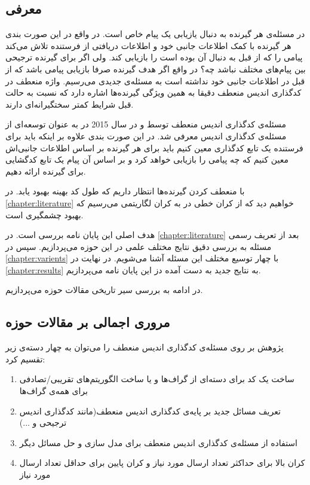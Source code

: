  \subsection{معرفی}
 در مسئله‌ی
 \icod
 هر گیرنده به دنبال یازیابی یک پیام خاص است. در واقع در این صورت بندی هر گیرنده با کمک اطلاعات جانبی خود و اطلاعات دریافتی از فرستنده تلاش می‌کند پیامی را که از قبل به دنبال آن بوده است را بازیابی کند. ولی اگر برای گیرنده ترجیحی بین پیام‌های مختلف نباشد چه؟ در واقع اگر هدف گیرنده صرفا بازیابی پیامی باشد که از قبل در اطلاعات جانبی خود نداشته است به مسئله‌ی جدیدی می‌رسیم. واژه منعطف در کدگذاری اندیس منعطف دقیقا به همین ویژگی گیرنده‌ها اشاره دارد که نسبت به حالت قبل شرایط کمتر سختگیرانه‌ای دارند.
 
 مسئله‌ی کدگذاری اندیس منعطف توسط 
 و 
  در سال 2015 در
 \cite{pliablefirstpaper}
 به عنوان توسعه‌ای از مسئله‌ی کدگذاری اندیس معرفی شد. در این صورت بندی علاوه بر اینکه باید برای فرستنده یک تابع کدگذاری معین کنیم باید برای هر گیرنده بر اساس اطلاعات جانبی‌اش معین کنیم که چه پیامی را بازيابی خواهد کرد و بر اساس آن پیام یک تابع کدگشایی برای گیرنده ارائه دهیم.
 
 با منعطف کردن گیرنده‌ها انتظار داریم که طول کد بهینه بهبود یابد. در 
 \autoref{chapter:literature}
 خواهیم دید که از کران خطی در
 \icod
 به کران لگاریتمی می‌رسیم که بهبود چشمگیری است.
 
 هدف اصلی این پایان نامه بررسی
 \picod
 است. در 
 \autoref{chapter:literature}
 بعد از تعریف رسمی مسئله به بررسی دقیق نتایج مختلف علمی در این حوزه می‌پردازیم. سپس در 
 \autoref{chapter:varients}
  با چهار توسیع مختلف این مسئله آشنا می‌شویم. در نهایت در
  \autoref{chapter:results}
  به نتایج جدید به دست آمده دز این پایان نامه می‌پردازیم.
  
  در ادامه به بررسی سیر تاریخی مقالات حوزه
  \picod
  می‌پردازیم.

 \subsection{
 	مروری اجمالی بر مقالات حوزه
 	\picod
 }پژوهش بر روی مسئله‌ی کدگذاری اندیس منعطف را می‌توان به چهار دسته‌ی زیر تقسیم کرد:
 \begin{enumerate}
 	\item 
 	ساخت یک کد برای دسته‌ای از گراف‌ها و یا ساخت الگوریتم‌های تقریبی/تصادفی برای همه‌ی گراف‌ها
 	\item 
 	تعریف مسائل جدید بر پایه‌ی کدگذاری اندیس منعطف(مانند کدگذاری اندیس ترجیحی و ...)
 	\item 
 	استفاده از مسئله‌ی کدگذاری اندیس منعطف برای مدل سازی و حل مسائل دیگر
 	\item 
 	کران بالا برای حداکثر تعداد ارسال مورد نیاز و کران پایین برای حداقل تعداد ارسال مورد نیاز
 \end{enumerate}
 
